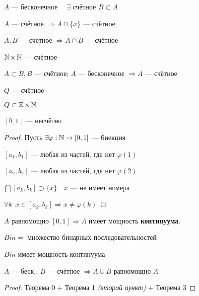    \setcounter{theorem}{-1}

    \begin{theorem}
        $A$ --- бесконечное $\quad \exists$ счётное $B\subset A$
    \end{theorem}

    \begin{theorem}
            $A$ --- счётное $\Rightarrow A\cap\{x\}$ --- счётное

            $A, B$ --- счётное $\Rightarrow A\cap B$ --- счётное
    \end{theorem}
    \begin{theorem}
        $\operatorname*{\mathbb{N}}\times\operatorname*{\mathbb{N}}$ --- счётное
    \end{theorem}
    \begin{theorem}
        $A\subset B, B$ --- счётное; $A$ --- бесконечное $\Rightarrow A$ --- счётное
    \end{theorem}
    \begin{consequence}
        $Q$ --- счётное

        $Q\subset \operatorname*{\mathbb{Z}}\times\operatorname*{\mathbb{N}}$
    \end{consequence}
    \begin{theorem}
        $[0,1]$ --- несчётно
    \end{theorem}
    \begin{proof}
        Пусть $\exists \varphi: \operatorname*{\mathbb{N}}\to[0,1]$ --- биекция

        $[a_1, b_1]$ --- любая из частей, где нет $\varphi(1)$

        $[a_2, b_2]$ --- любая из частей, где нет $\varphi(2)$

        $\bigcap[a_k, b_k]\supset\{x\} \quad x$ --- не имеет номера
        
        $\forall k \ \ x\in[a_k,b_k]\Rightarrow x\not=\varphi(k)$
    \end{proof}
    \begin{definition}
        $A$ равномощно $[0,1] \Rightarrow A$ имеет мощность \textbf{континуума}.
    \end{definition}
    $Bin=$ множество бинарных последовательностей
    \begin{theorem}
        $Bin$ имеет мощность континуума
    \end{theorem}
    \begin{lemma}
        $A$ --- беск., $B$ --- счётное $\Rightarrow A\cup B$ равномощно $A$
    \end{lemma}
    \begin{proof}
        Теорема 0 + Теорема 1 \textit{(второй пункт)} + Теорема 3
    \end{proof}
